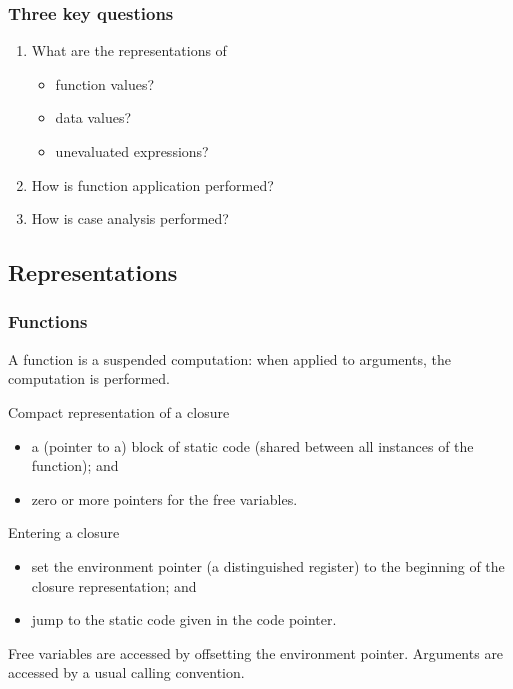 \documentclass{beamer}
\begin{document}
\begin{frame}
    \frametitle{Three key questions}

    \begin{enumerate}
        \item What are the representations of
            \begin{itemize}
                \item function values?
                \item data values?
                \item unevaluated expressions?
            \end{itemize}

        \item How is function application performed?

        \item How is case analysis performed?
    \end{enumerate}
\end{frame}

\subsection{Representations}

\begin{frame}
    \frametitle{Functions}

    A function is a suspended computation: when applied to arguments, the
    computation is performed.

    \begin{block}{Compact representation of a closure}
        \begin{itemize}
            \item
                a (pointer to a) block of \alert{static code} (shared between
                all instances of the function); and
            \item
                zero or more pointers for the \alert{free variables}.
        \end{itemize}
    \end{block}


    \begin{block}{Entering a closure}
        \begin{itemize}
            \item
                set the \alert{environment pointer} (a distinguished register)
                to the beginning of the closure representation; and
            \item
                jump to the static code given in the code pointer.
        \end{itemize}
        Free variables are accessed by offsetting the environment pointer.
        Arguments are accessed by a usual calling convention.
    \end{block}
\end{frame}
\end{document}
